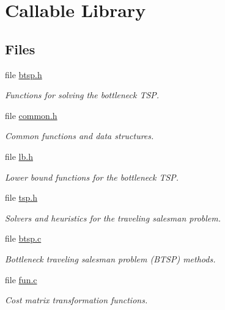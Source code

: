 \hypertarget{group__lib}{
\section{Callable Library}
\label{group__lib}
}
\subsection*{Files}
\begin{CompactItemize}
\item 
file \hyperlink{btsp_8h}{btsp.h}
\begin{CompactList}\small\item\em Functions for solving the bottleneck TSP. \item\end{CompactList}

\item 
file \hyperlink{common_8h}{common.h}
\begin{CompactList}\small\item\em Common functions and data structures. \item\end{CompactList}

\item 
file \hyperlink{lb_8h}{lb.h}
\begin{CompactList}\small\item\em Lower bound functions for the bottleneck TSP. \item\end{CompactList}

\item 
file \hyperlink{tsp_8h}{tsp.h}
\begin{CompactList}\small\item\em Solvers and heuristics for the traveling salesman problem. \item\end{CompactList}

\item 
file \hyperlink{lib_2btsp_2btsp_8c}{btsp.c}
\begin{CompactList}\small\item\em Bottleneck traveling salesman problem (BTSP) methods. \item\end{CompactList}

\item 
file \hyperlink{fun_8c}{fun.c}
\begin{CompactList}\small\item\em Cost matrix transformation functions. \item\end{CompactList}


\end{CompactItemize}

